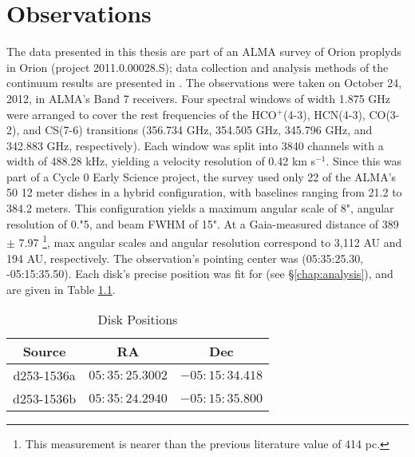\chapter{Observations}
\label{chap:observations}




The data presented in this thesis are part of an ALMA survey of Orion proplyds in Orion (project 2011.0.00028.S); data collection and analysis methods of the continuum results are presented in \citet{Mann2014}. The observations were taken on October 24, 2012, in ALMA's Band 7 receivers. Four spectral windows of width 1.875 GHz were arranged to cover the rest frequencies of the HCO$^+$(4-3), HCN(4-3), CO(3-2), and CS(7-6) transitions (356.734 GHz, 354.505 GHz, 345.796 GHz, and 342.883 GHz, respectively). Each window was split into 3840 channels with a width of 488.28 kHz, yielding a velocity resolution of 0.42 km s$^{-1}$. Since this was part of a Cycle 0 Early Science project, the survey used only 22 of the ALMA's 50 12 meter dishes in a hybrid configuration, with baselines ranging from 21.2 to 384.2 meters. This configuration yields a maximum angular scale of 8", angular resolution of 0."5, and beam FWHM of 15". At a Gaia-measured distance of 389 $\pm$ 7.97 \citep{GaiaCollaboration2018,GaiaCollaboration2018}\footnote{This measurement is nearer than the previous literature value of 414 pc.}, max angular scales and angular resolution correspond to 3,112 AU and 194 AU, respectively. The observation's pointing center was (05:35:25.30, -05:15:35.50). Each disk's precise position was fit for (see \S\ref{chap:analysis}), and are given in Table \ref{table:disk_positions}.


\begin{table}
  \centering
  \caption{Disk Positions}
  \label{table:disk_positions}
  \renewcommand{\arraystretch}{1.2}
  \begin{tabular}{c | c | c }
    \toprule \toprule
      Source      &  RA            & Dec \\
    \midrule %
      d253-1536a  &  $05:35:25.3002$ & $-05:15:34.418$  \\
      d253-1536b  &  $05:35:24.2940$ & $-05:15:35.800$  \\
    \bottomrule
  \end{tabular}
\end{table}

